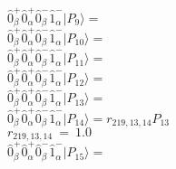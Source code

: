\documentclass[14pt]{article}
\begin{document}
    $ \hat{0}_{\beta}^{+}\hat{0}_{\alpha}^{+}\hat{0}_{\beta}^{-}\hat{1}_{\alpha}^{-} \vert{P_{9}}\rangle =  $ \\ 
    $ \hat{0}_{\beta}^{+}\hat{0}_{\alpha}^{+}\hat{0}_{\beta}^{-}\hat{1}_{\alpha}^{-} \vert{P_{10}}\rangle =  $ \\ 
    $ \hat{0}_{\beta}^{+}\hat{0}_{\alpha}^{+}\hat{0}_{\beta}^{-}\hat{1}_{\alpha}^{-} \vert{P_{11}}\rangle =  $ \\ 
    $ \hat{0}_{\beta}^{+}\hat{0}_{\alpha}^{+}\hat{0}_{\beta}^{-}\hat{1}_{\alpha}^{-} \vert{P_{12}}\rangle =  $ \\ 
    $ \hat{0}_{\beta}^{+}\hat{0}_{\alpha}^{+}\hat{0}_{\beta}^{-}\hat{1}_{\alpha}^{-} \vert{P_{13}}\rangle =  $ \\ 
    $ \hat{0}_{\beta}^{+}\hat{0}_{\alpha}^{+}\hat{0}_{\beta}^{-}\hat{1}_{\alpha}^{-} \vert{P_{14}}\rangle = {r}_{219,13,14}P_{13} $ \\ 
    ${r}_{219,13,14}\ =\ 1.0 $ \\ 
    $ \hat{0}_{\beta}^{+}\hat{0}_{\alpha}^{+}\hat{0}_{\beta}^{-}\hat{1}_{\alpha}^{-} \vert{P_{15}}\rangle =  $ \\ 
    
\end{document}
